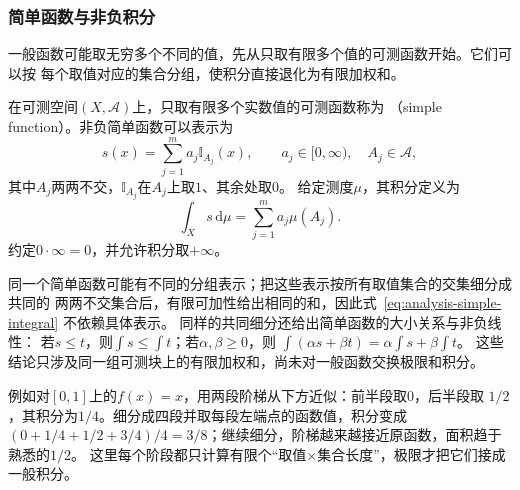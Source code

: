 \subsubsection{简单函数与非负积分}
一般函数可能取无穷多个不同的值，先从只取有限多个值的可测函数开始。它们可以按
每个取值对应的集合分组，使积分直接退化为有限加权和。
\begin{definition}[简单函数及其积分]
\label{def:analysis-simple-function-integral}
在可测空间$(X,\mathcal{A})$上，只取有限多个实数值的可测函数称为
（simple function）。非负简单函数可以表示为
\[   s(x)=\sum_{j=1}^{m}a_j\mathbb{I}_{A_j}(x),   \qquad a_j\in[0,\infty),\quad A_j\in\mathcal{A}, \]
其中$A_j$两两不交，$\mathbb{I}_{A_j}$在$A_j$上取$1$、其余处取$0$。
给定测度$\mu$，其积分定义为
\begin{equation}
  \int_X s\,\mathrm{d}\mu
  =
  \sum_{j=1}^{m}a_j\mu(A_j).
\label{eq:analysis-simple-integral}
\end{equation}
约定$0\cdot\infty=0$，并允许积分取$+\infty$。
\end{definition}
同一个简单函数可能有不同的分组表示；把这些表示按所有取值集合的交集细分成共同的
两两不交集合后，有限可加性给出相同的和，因此式~\eqref{eq:analysis-simple-integral}
不依赖具体表示。
同样的共同细分还给出简单函数的大小关系与非负线性：
若$s\leq t$，则$\int s\leq\int t$；若$\alpha,\beta\geq0$，则
$\int(\alpha s+\beta t)=\alpha\int s+\beta\int t$。
这些结论只涉及同一组可测块上的有限加权和，尚未对一般函数交换极限和积分。

例如对$[0,1]$上的$f(x)=x$，用两段阶梯从下方近似：前半段取$0$，后半段取
$1/2$，其积分为$1/4$。细分成四段并取每段左端点的函数值，积分变成
$(0+1/4+1/2+3/4)/4=3/8$；继续细分，阶梯越来越接近原函数，面积趋于熟悉的$1/2$。
这里每个阶段都只计算有限个“取值$\times$集合长度”，极限才把它们接成一般积分。

